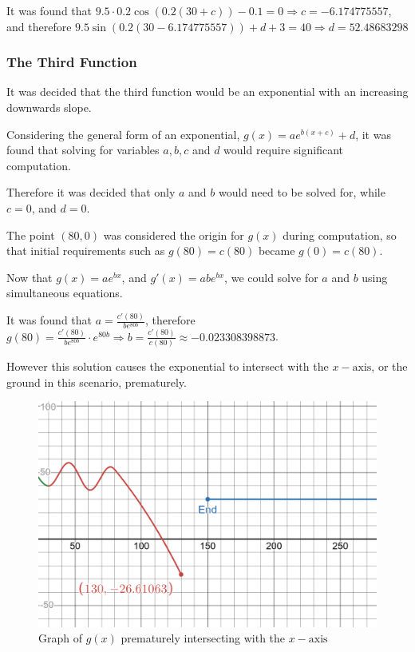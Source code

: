 \documentclass[11pt, letterpaper]{article}
\begin{document}
It was found  that $9.5\cdot0.2\cos (0.2(30+c))-0.1=0 \Rightarrow c=-6.174775557$, and therefore $9.5\sin(0.2(30-6.174775557))+d+3=40 \Rightarrow d=52.48683298$

\subsubsection{The Third Function}


It was decided that the third function would be an exponential with an increasing downwards slope.

 Considering the general form of an exponential, $g(x)=ae^{b(x+c)}+d$, it was found that solving for variables $a, b, c$ and $d$ would require significant computation.

Therefore it was decided that only $a$ and $b$ would need to be solved for, while $c=0$, and $d=0$.

The point $(80, 0)$ was considered the origin for $g(x)$ during computation, so that  initial requirements such as $g(80)=c(80)$ became $g(0)=c(80)$. 

Now that $g(x)=ae^{bx}$, and $g'(x)=abe^{bx}$, we could solve for $a$ and $b$ using simultaneous equations.

It was found that $a=\frac{c'(80)}{be^{80b}}$, therefore $g(80)=\frac{c'(80)}{be^{80b}}\cdot e^{80b}\Rightarrow b=\frac{c'(80)}{c(80)}\approx -0.023308398873$.

However this solution causes the exponential to intersect with the $x-\textrm{axis}$, or the ground in this scenario, prematurely. 
	\begin{figure}[h]
		\centering
		\includegraphics[width=15cm]{PrematureIntersecion.png}
		\caption{Graph of $g(x)$ prematurely intersecting with the $x-\textrm{axis}$}
	\end{figure}
\end{document}
